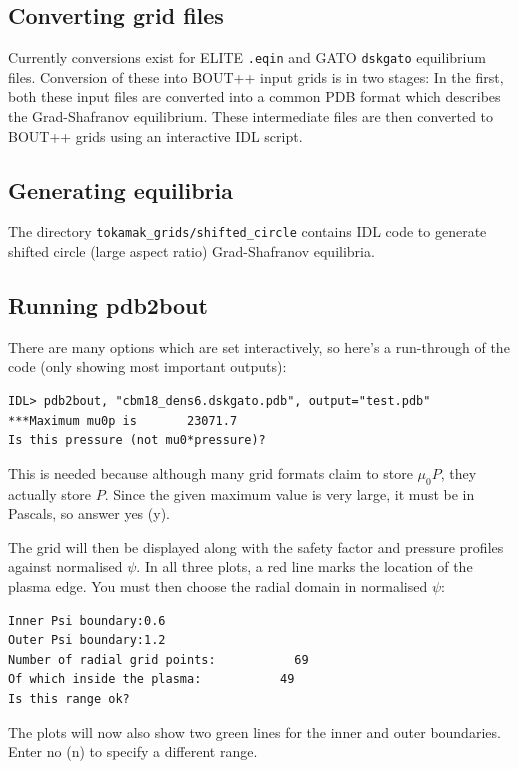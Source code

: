 \documentclass[12pt]{article}
\newcommand{\code}[1]{\texttt{#1}}
\begin{document}
\subsection{Converting grid files}
Currently conversions exist for ELITE \code{.eqin} and GATO \code{dskgato} equilibrium files.
Conversion of these into BOUT++ input grids is in two stages: In the first, both these
input files are converted into a common PDB format which describes the Grad-Shafranov equilibrium.
These intermediate files are then converted to BOUT++ grids using an interactive IDL script.


\subsection{Generating equilibria}

The directory \texttt{tokamak\_grids/shifted\_circle} contains IDL code to generate shifted circle
(large aspect ratio) Grad-Shafranov equilibria.

\subsection{Running pdb2bout}

There are many options which are set interactively, so here's a run-through of the code (only showing most important outputs):

\begin{verbatim}
IDL> pdb2bout, "cbm18_dens6.dskgato.pdb", output="test.pdb"
***Maximum mu0p is       23071.7
Is this pressure (not mu0*pressure)?
\end{verbatim}
This is needed because although many grid formats claim to store $\mu_0 P$, they actually store $P$. Since the given maximum value is very large, it must be in Pascals, so answer yes (y).

The grid will then be displayed along with the safety factor and pressure
profiles against normalised $\psi$. In all three plots, a red line marks the
location of the plasma edge. You must then choose the radial domain in normalised $\psi$:
\begin{verbatim}
Inner Psi boundary:0.6
Outer Psi boundary:1.2
Number of radial grid points:           69
Of which inside the plasma:           49
Is this range ok?
\end{verbatim}
The plots will now also show two green lines for the inner and outer boundaries. Enter no (n) to specify a different range.
\end{document}

